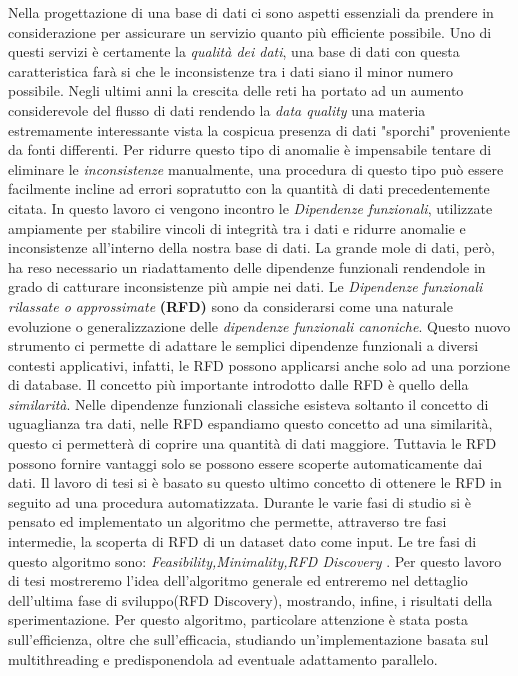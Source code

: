 Nella progettazione di una base di dati ci sono aspetti essenziali da prendere in considerazione per assicurare un servizio quanto più efficiente possibile.
Uno di questi servizi è certamente la \emph{qualità dei dati}, una base di dati con questa caratteristica farà si che le inconsistenze tra i dati siano il minor numero possibile.
Negli ultimi anni la crescita delle reti ha portato ad un aumento considerevole del flusso di dati  rendendo la \emph{data quality} una materia estremamente interessante vista la cospicua presenza di dati "sporchi" proveniente da fonti differenti.
Per ridurre questo tipo di anomalie è impensabile tentare di eliminare le \emph{inconsistenze} manualmente,  una procedura di questo tipo può essere facilmente incline ad errori sopratutto con la quantità di dati precedentemente citata.
In questo lavoro ci vengono incontro le \emph{Dipendenze funzionali}, utilizzate ampiamente per stabilire vincoli di integrità tra i dati e ridurre anomalie e inconsistenze all'interno della nostra base di dati.
La grande mole di dati, però, ha reso necessario un riadattamento delle dipendenze funzionali rendendole in grado di catturare inconsistenze più ampie nei dati. 
Le \emph{Dipendenze funzionali rilassate o approssimate} \textbf{(RFD)} sono da considerarsi come una naturale evoluzione o generalizzazione delle \emph{dipendenze funzionali canoniche}.
Questo nuovo strumento ci permette di adattare le semplici dipendenze funzionali a diversi contesti applicativi, infatti, le RFD possono applicarsi anche solo ad una porzione di database.
Il concetto più importante introdotto dalle RFD è quello della \emph{similarità}.
Nelle dipendenze funzionali classiche esisteva soltanto il concetto di uguaglianza tra dati, nelle RFD espandiamo questo concetto ad una similarità, questo ci permetterà di coprire una quantità di dati maggiore.
Tuttavia le RFD possono fornire vantaggi solo se possono essere scoperte automaticamente dai dati.
Il lavoro di tesi si è basato su questo ultimo concetto di ottenere le RFD in seguito ad una procedura automatizzata.
Durante le varie fasi di studio si è pensato ed implementato un algoritmo che permette, attraverso tre fasi intermedie, la scoperta di RFD di un dataset dato come input.
Le tre fasi di questo algoritmo sono: \emph{Feasibility,Minimality,RFD Discovery} .
Per questo lavoro di tesi mostreremo l'idea dell'algoritmo generale ed entreremo nel dettaglio dell'ultima fase di sviluppo(RFD Discovery), mostrando, infine, i risultati della sperimentazione.
Per questo algoritmo, particolare attenzione è stata posta sull'efficienza, oltre che sull'efficacia, studiando un'implementazione basata sul multithreading e predisponendola ad eventuale adattamento parallelo.